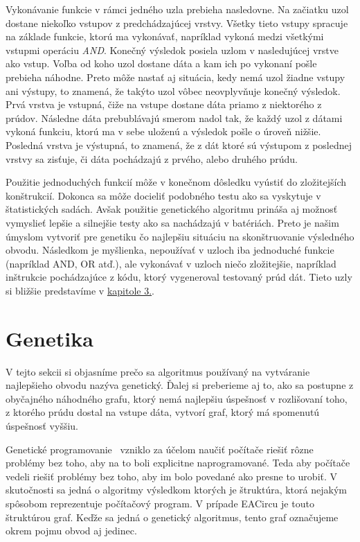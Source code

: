 Vykonávanie funkcie v rámci jedného uzla prebieha nasledovne. Na začiatku uzol dostane niekoľko vstupov z predchádzajúcej vrstvy. Všetky tieto vstupy spracuje na základe funkcie, ktorú ma vykonávať, napríklad vykoná medzi všetkými vstupmi operáciu \textit{AND}. Konečný výsledok posiela uzlom v nasledujúcej vrstve ako vstup. Voľba od koho uzol dostane dáta a kam ich po vykonaní pošle prebieha náhodne. Preto môže nastať aj situácia, kedy nemá uzol žiadne vstupy ani výstupy, to znamená, že takýto uzol vôbec neovplyvňuje konečný výsledok. Prvá vrstva je vstupná, čiže na vstupe dostane dáta priamo z niektorého z prúdov. Následne dáta prebublávajú smerom nadol tak, že každý uzol z dátami vykoná funkciu, ktorú ma v sebe uloženú a výsledok pošle o úroveň nižšie. Posledná vrstva je výstupná, to znamená, že z dát ktoré sú výstupom z poslednej vrstvy sa zisťuje, či dáta pochádzajú z prvého, alebo druhého prúdu.

Použitie jednoduchých funkcií môže v konečnom dôsledku vyústiť do zložitejších konštrukcií. Dokonca sa môže docieliť podobného testu ako sa vyskytuje v štatistických sadách. Avšak použitie genetického algoritmu prináša aj možnosť vymyslieť lepšie a silnejšie testy ako sa nachádzajú v batériách. Preto je našim úmyslom vytvoriť pre genetiku čo najlepšiu situáciu na skonštruovanie výsledného obvodu. Následkom je myšlienka, nepoužívať v uzloch iba jednoduché funkcie (napríklad AND, OR atď.), ale vykonávať v uzloch niečo zložitejšie, napríklad inštrukcie pochádzajúce z kódu, ktorý vygeneroval testovaný prúd dát. Tieto uzly si bližšie predstavíme v \hyperref[chap:eacirc-jvmsim]{kapitole 3.}.


\section{Genetika}
\label{sec:genetics}

V tejto sekcii si objasníme prečo sa algoritmus používaný na vytváranie najlepšieho obvodu nazýva genetický. Ďalej si preberieme aj to, ako sa postupne z obyčajného náhodného grafu, ktorý nemá najlepšiu úspešnosť v rozlišovaní toho, z ktorého prúdu dostal na vstupe dáta, vytvorí graf, ktorý má spomenutú úspešnosť vyššiu.

{Genetické programovanie}~\cite{koza1992genetic} vzniklo za účelom naučiť počítače riešiť rôzne problémy bez toho, aby na to boli explicitne naprogramované. Teda aby počítače vedeli riešiť problémy bez toho, aby im bolo povedané ako presne to urobiť. V skutočnosti sa jedná o algoritmy výsledkom ktorých je štruktúra, ktorá nejakým spôsobom reprezentuje počítačový program. V prípade EACircu je touto štruktúrou graf. Keďže sa jedná o genetický algoritmus, tento graf označujeme okrem pojmu obvod aj jedinec. 

